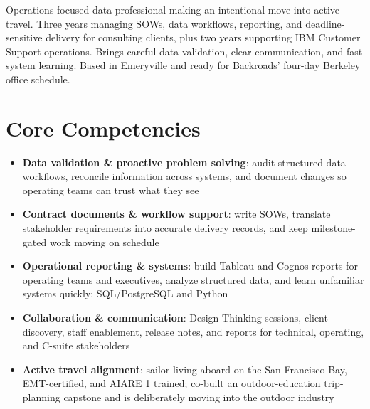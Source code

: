 \documentclass[11pt,a4paper,sans]{moderncv}
\begin{document}
\makecvtitle


\vspace{6pt}
\small{Operations-focused data professional making an intentional move into active travel. Three years managing SOWs, data workflows, reporting, and deadline-sensitive delivery for consulting clients, plus two years supporting IBM Customer Support operations. Brings careful data validation, clear communication, and fast system learning. Based in Emeryville and ready for Backroads' four-day Berkeley office schedule.}


\section{Core Competencies}
\vspace{1pt}
\begin{itemize}

\item \textbf{Data validation \& proactive problem solving}: audit structured data workflows, reconcile information across systems, and document changes so operating teams can trust what they see

\item \textbf{Contract documents \& workflow support}: write SOWs, translate stakeholder requirements into accurate delivery records, and keep milestone-gated work moving on schedule

\item \textbf{Operational reporting \& systems}: build Tableau and Cognos reports for operating teams and executives, analyze structured data, and learn unfamiliar systems quickly; SQL/PostgreSQL and Python

\item \textbf{Collaboration \& communication}: Design Thinking sessions, client discovery, staff enablement, release notes, and reports for technical, operating, and C-suite stakeholders

\item \textbf{Active travel alignment}: sailor living aboard on the San Francisco Bay, EMT-certified, and AIARE 1 trained; co-built an outdoor-education trip-planning capstone and is deliberately moving into the outdoor industry

\end{itemize}
\end{document}
